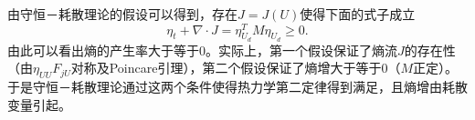 	由守恒－耗散理论的假设可以得到，存在$J = J(U)$使得下面的式子成立
	\begin{equation*}
		\eta_t + \nabla \cdot J = \eta_{U_d}^T M \eta_{U_d} \ge 0.
	\end{equation*}
	由此可以看出熵的产生率大于等于0。实际上，第一个假设保证了熵流$J$的存在性（由$\eta_{UU} F_{jU}$对称及Poincare引理），第二个假设保证了熵增大于等于0（$M$正定）。于是守恒－耗散理论通过这两个条件使得热力学第二定律得到满足，且熵增由耗散变量引起\cite{zhu2014conservation}。
	
	
